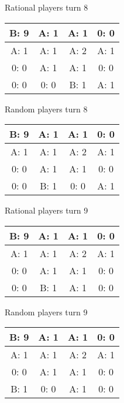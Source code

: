 \documentclass[12pt]{article}
\begin{document}
Rational players turn 8
\begin{center}
\begin{tabular}{|c|c|c|c|} 
\hline
B: 9  & A: 1  & A: 1  & 0: 0  \\ \hline
A: 1  & A: 1  & A: 2  & A: 1  \\ \hline
0: 0  & A: 1  & A: 1  & 0: 0  \\ \hline
0: 0  & 0: 0  & B: 1  & A: 1  \\ \hline
\end{tabular} 
\end{center}
Random players turn 8
\begin{center}
\begin{tabular}{|c|c|c|c|} 
\hline
B: 9  & A: 1  & A: 1  & 0: 0  \\ \hline
A: 1  & A: 1  & A: 2  & A: 1  \\ \hline
0: 0  & A: 1  & A: 1  & 0: 0  \\ \hline
0: 0  & B: 1  & 0: 0  & A: 1  \\ \hline
\end{tabular} 
\end{center}

Rational players turn 9
\begin{center}
\begin{tabular}{|c|c|c|c|} 
\hline
B: 9  & A: 1  & A: 1  & 0: 0  \\ \hline
A: 1  & A: 1  & A: 2  & A: 1  \\ \hline
0: 0  & A: 1  & A: 1  & 0: 0  \\ \hline
0: 0  & B: 1  & A: 1  & 0: 0  \\ \hline
\end{tabular} 
\end{center}
Random players turn 9
\begin{center}
\begin{tabular}{|c|c|c|c|} 
\hline
B: 9  & A: 1  & A: 1  & 0: 0  \\ \hline
A: 1  & A: 1  & A: 2  & A: 1  \\ \hline
0: 0  & A: 1  & A: 1  & 0: 0  \\ \hline
B: 1  & 0: 0  & A: 1  & 0: 0  \\ \hline
\end{tabular} 
\end{center}
\end{document}
